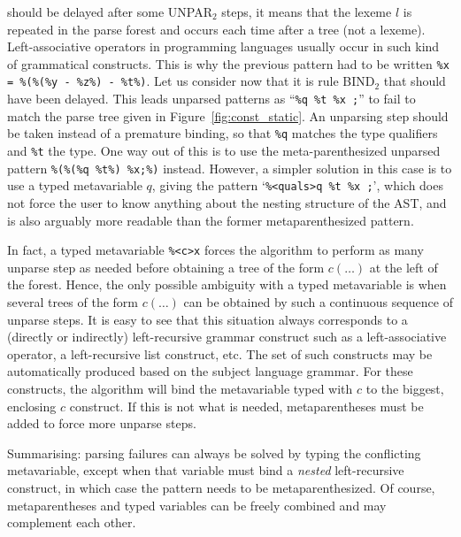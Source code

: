 should be delayed after some \textsf{UNPAR}\(_2\) steps, it means that
the lexeme \(l\) is repeated in the parse forest and occurs each time
after a tree (not a lexeme). Left\hyp{}associative operators in
programming languages usually occur in such kind of grammatical
constructs. This is why the previous pattern had to be written
\texttt{\%x = \%(\%(\%y - \%z\%) - \%t\%)}. Let us consider now that
it is rule \textsf{BIND}\(_2\) that should have been delayed. This
leads unparsed patterns as ``\texttt{\%q \%t \%x ;}'' to fail to match
the parse tree given in Figure~\ref{fig:const_static}. An unparsing
step should be taken instead of a premature binding, so that
\texttt{\%q} matches the type qualifiers and \texttt{\%t} the
type. One way out of this is to use the meta-parenthesized unparsed
pattern \texttt{\%(\%(\%q \%t\%) \%x;\%)} instead. However, a simpler
solution in this case is to use a typed meta\-variable $q$, giving the
pattern `\texttt{\%<quals>q \%t \%x ;}', which does not force the user
to know anything about the nesting structure of the AST, and is also
arguably more readable than the former meta\-parenthesized pattern.

In fact, a typed meta\-variable \texttt{\%<c>x} forces the algorithm
to perform as many unparse step as needed before obtaining a tree of
the form \(c(\ldots)\) at the left of the forest. Hence, the only
possible ambiguity with a typed meta\-variable is when several trees
of the form \(c(\ldots)\) can be obtained by such a continuous
sequence of unparse steps. It is easy to see that this situation
always corresponds to a (directly or indirectly) left\hyp{}recursive
grammar construct such as a left\hyp{}associative operator, a
left\hyp{}recursive list construct, etc. The set of such constructs
may be automatically produced based on the subject language
grammar. For these constructs, the algorithm will bind the
meta\-variable typed with \(c\) to the biggest, enclosing \(c\)
construct. If this is not what is needed, meta\-parentheses must be
added to force more unparse steps.

Summarising: parsing failures can always be solved by typing the
conflicting meta\-variable, except when that variable must bind a
\emph{nested} left\hyp{}recursive construct, in which case the pattern
needs to be meta\-parenthesized. Of course, meta\-parentheses and
typed variables can be freely combined and may complement each other.

